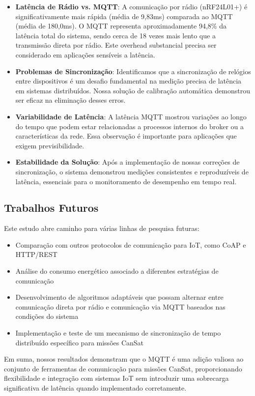 \documentclass[hidelinks]{sbrt}
\begin{document}
\begin{itemize}
    \item \textbf{Latência de Rádio vs. MQTT}: A comunicação por rádio (nRF24L01+) é significativamente mais rápida (média de 9,83ms) comparada ao MQTT (média de 180,0ms). O MQTT representa aproximadamente 94,8\% da latência total do sistema, sendo cerca de 18 vezes mais lento que a transmissão direta por rádio. Este overhead substancial precisa ser considerado em aplicações sensíveis a latência.
    
    \item \textbf{Problemas de Sincronização}: Identificamos que a sincronização de relógios entre dispositivos é um desafio fundamental na medição precisa de latência em sistemas distribuídos. Nossa solução de calibração automática demonstrou ser eficaz na eliminação desses erros.
    
    \item \textbf{Variabilidade de Latência}: A latência MQTT mostrou variações ao longo do tempo que podem estar relacionadas a processos internos do broker ou a características da rede. Essa observação é importante para aplicações que exigem previsibilidade.
    
    \item \textbf{Estabilidade da Solução}: Após a implementação de nossas correções de sincronização, o sistema demonstrou medições consistentes e reproduzíveis de latência, essenciais para o monitoramento de desempenho em tempo real.
\end{itemize}


\subsection{Trabalhos Futuros}

Este estudo abre caminho para várias linhas de pesquisa futuras:

\begin{itemize}
    \item Comparação com outros protocolos de comunicação para IoT, como CoAP e HTTP/REST
    \item Análise do consumo energético associado a diferentes estratégias de comunicação
    \item Desenvolvimento de algoritmos adaptáveis que possam alternar entre comunicação direta por rádio e comunicação via MQTT baseados nas condições do sistema
    \item Implementação e teste de um mecanismo de sincronização de tempo distribuído específico para missões CanSat
\end{itemize}

Em suma, nossos resultados demonstram que o MQTT é uma adição valiosa ao conjunto de ferramentas de comunicação para missões CanSat, proporcionando flexibilidade e integração com sistemas IoT sem introduzir uma sobrecarga significativa de latência quando implementado corretamente.



\end{document}
